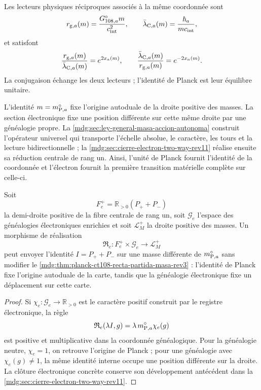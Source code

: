 Les lecteurs physiques réciproques associés à la même coordonnée sont
\[
 r_{{\rm g},a}(m)=\frac{G_{108,a}^{\circ}m}{c_{\rm int}^{2}},
 \qquad
 \bar\lambda_{{\rm C},a}(m)=\frac{\hbar_a}{mc_{\rm int}},
\]
et satisfont
\begin{equation}
 \frac{r_{{\rm g},a}(m)}{\bar\lambda_{{\rm C},a}(m)}
 =e^{2x_a(m)},
 \qquad
 \frac{\bar\lambda_{{\rm C},a}(m)}{r_{{\rm g},a}(m)}
 =e^{-2x_a(m)}.
 \label{mdg:eq:planck-ct108-lectores-exponenciales-rev3}
\end{equation}
La conjugaison échange les deux lecteurs ; l’identité de Planck est leur
équilibre unitaire.

\begin{remark}
L’identité \(m=m_{{\rm P},a}^{\circ}\) fixe l’origine autoduale de la droite
positive des masses. La section électronique fixe une position différente sur
cette même droite par une généalogie propre. La
\cref{mdg:sec:ley-general-masa-accion-autonoma} construit l’opérateur universel
qui transporte l’échelle absolue, le caractère, les tours et la lecture bidirectionnelle ;
la \cref{mdg:sec:cierre-electron-two-way-rev11} réalise ensuite sa réduction
centrale de rang un. Ainsi, l’unité de Planck fournit l’identité de
la coordonnée et l’électron fournit la première transition matérielle
complète sur celle-ci.
\end{remark}

\begin{proposition}
\label{mdg:prop:planck-ct108-realizacion-centro-electron-rev3}
Soit
\[
 F_e^+=\mathbb R_{>0}(P_++P_-)
\]
la demi-droite positive de la fibre centrale de rang un, soit
\(\mathcal G_e\) l’espace des généalogies
électroniques enrichies et soit \(\mathcal L_M^+\) la droite positive des
masses. Un morphisme de réalisation
\[
 \mathfrak R_e:
 F_e^+\times\mathcal G_e\longrightarrow\mathcal L_M^+
\]
peut envoyer l’identité \(I=P_++P_-\) sur une masse différente de
\(m_{{\rm P},a}^{\circ}\) sans modifier le
\cref{mdg:thm:planck-ct108-recta-partida-masa-rev3} : l’identité de Planck fixe
l’origine autoduale de la carte, tandis que la généalogie électronique fixe un
déplacement sur cette carte.
\end{proposition}

\begin{proof}
Si \(\chi_e:\mathcal G_e\to\mathbb R_{>0}\) est le caractère positif construit
par le registre électronique, la règle
\[
 \mathfrak R_e(\lambda I,g)
 =\lambda\,m_{{\rm P},a}^{\circ}\chi_e(g)
\]
est positive et multiplicative dans la coordonnée généalogique. Pour la généalogie
neutre, \(\chi_e=1\), on retrouve l’origine de Planck ; pour une généalogie avec
\(\chi_e(g)\ne1\), la même identité interne occupe une position différente sur
la droite. La clôture électronique concrète conserve son développement antécédent dans la
\cref{mdg:sec:cierre-electron-two-way-rev11}.
\end{proof}
